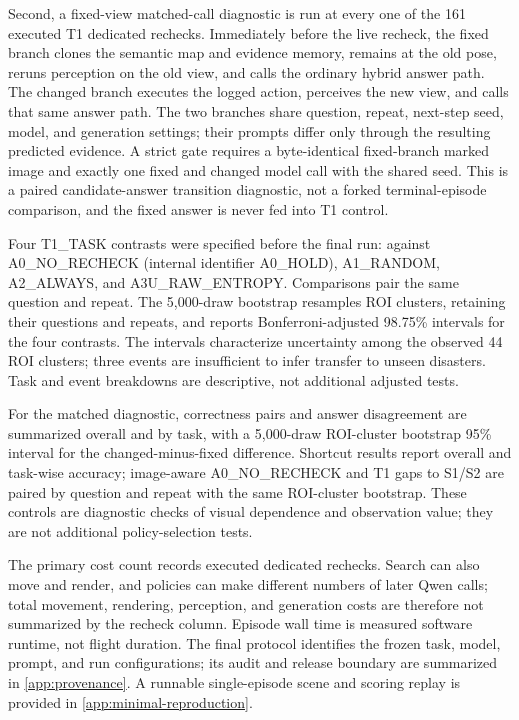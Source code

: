 Second, a fixed-view matched-call diagnostic is run at every one of the 161 executed T1 dedicated rechecks. Immediately before the live recheck, the fixed branch clones the semantic map and evidence memory, remains at the old pose, reruns perception on the old view, and calls the ordinary hybrid answer path. The changed branch executes the logged action, perceives the new view, and calls that same answer path. The two branches share question, repeat, next-step seed, model, and generation settings; their prompts differ only through the resulting predicted evidence. A strict gate requires a byte-identical fixed-branch marked image and exactly one fixed and changed model call with the shared seed. This is a paired candidate-answer transition diagnostic, not a forked terminal-episode comparison, and the fixed answer is never fed into T1 control.

Four T1\_TASK contrasts were specified before the final run: against A0\_NO\_RECHECK (internal identifier A0\_HOLD), A1\_RANDOM, A2\_ALWAYS, and A3U\_RAW\_ENTROPY. Comparisons pair the same question and repeat. The 5,000-draw bootstrap resamples ROI clusters, retaining their questions and repeats, and reports Bonferroni-adjusted 98.75\% intervals for the four contrasts. The intervals characterize uncertainty among the observed 44 ROI clusters; three events are insufficient to infer transfer to unseen disasters. Task and event breakdowns are descriptive, not additional adjusted tests.

For the matched diagnostic, correctness pairs and answer disagreement are summarized overall and by task, with a 5,000-draw ROI-cluster bootstrap 95\% interval for the changed-minus-fixed difference. Shortcut results report overall and task-wise accuracy; image-aware A0\_NO\_RECHECK and T1 gaps to S1/S2 are paired by question and repeat with the same ROI-cluster bootstrap. These controls are diagnostic checks of visual dependence and observation value; they are not additional policy-selection tests.

The primary cost count records executed dedicated rechecks. Search can also move and render, and policies can make different numbers of later Qwen calls; total movement, rendering, perception, and generation costs are therefore not summarized by the recheck column. Episode wall time is measured software runtime, not flight duration. The final protocol identifies the frozen task, model, prompt, and run configurations; its audit and release boundary are summarized in \ref{app:provenance}. A runnable single-episode scene and scoring replay is provided in \ref{app:minimal-reproduction}.
